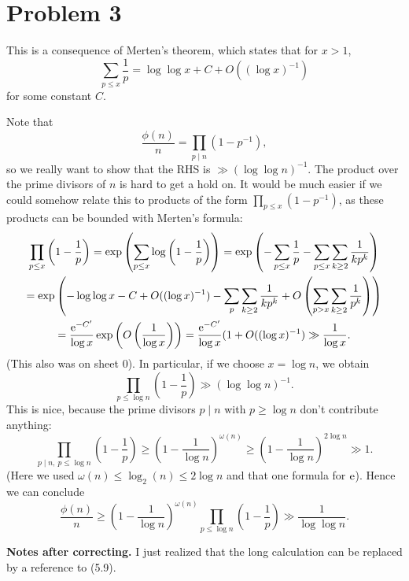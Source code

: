 \documentclass[a4paper,11pt]{article}
\begin{document}
\section*{Problem 3}
This is a consequence of Merten's theorem, which states that for 
$x > 1$, 
\[
    \sum_{p \leq x} \frac 1p = \log \log x + C + O((\log x)^{-1})
\]
for some constant $C$. 

Note that 
\[
    \frac{\phi(n)}n = \prod_{p \mid n} (1 - p^{-1}),
\]
so we really want to show that the RHS is $\gg (\log \log n)^{-1}$. 
The product over the prime divisors of $n$ is hard to get a hold on. 
It would be much easier if we could somehow relate this to products of 
the form $\prod_{p \leq x} (1-p^{-1})$, as these products can be bounded
with Merten's formula:
\begin{multline*}
    \prod_{p \leq x} \left(1 - \frac 1p \right) 
    = \exp \left( \sum_{p \leq x} \log \left( 1- \frac 1p \right) \right) = \exp \left( - \sum_{p \leq x} \frac 1p - \sum_{p \leq x} \sum_{k \geq 2} \frac1{kp^k} \right) \\ 
    = \exp\left( - \log \log x -C + O((\log x)^{-1}) - \sum_p \sum_{k \geq 2} \frac1{kp^k} + O\left( \sum_{p > x} \sum_{k \geq 2} \frac1 {p^k} \right) \right) \\ 
    = \frac{ \mathrm e^{-C'}}{\log x} \exp \left( O \left( \frac 1{\log x} \right) \right) 
    = \frac{\mathrm e^{-C'}}{\log x}(1 + O((\log x)^{-1}) 
    \gg \frac 1{\log x}.
\end{multline*}
(This also was on sheet 0). 
In particular, if we choose $x = \log n$, we obtain
\[
    \prod_{p \leq \log n}\left(1 - \frac 1p\right) \gg (\log \log n)^{-1}.
\]
This is nice, because the prime divisors $p \mid n$ with $p \geq \log n$ 
don't contribute anything: 
\[
    \prod_{p \mid n, \ p \leq \log n} \left(1 - \frac 1p\right)
    \geq \left( 1 - \frac 1 {\log n} \right)^{\omega(n)}
    \geq \left(1 - \frac 1 {\log n} \right)^{2 \log n} \gg 1.
\]
(Here we used $\omega(n) \leq \log_2(n) \leq 2 \log n$ and that one formula for $\mathrm e$). Hence we can conclude
\[
    \frac{\phi(n)}n \geq
    \left( 1 - \frac 1{\log n} \right)^{\omega(n)} \prod_{p \leq \log n}
    \left(1 - \frac 1p\right) \gg \frac 1{\log \log n}.
\]

\textbf{Notes after correcting.} I just realized that the long calculation 
can be replaced by a reference to (5.9).
\end{document}
